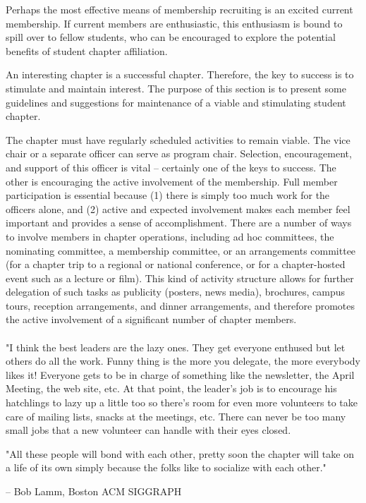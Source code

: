 Perhaps the most effective means of membership recruiting is an excited current membership. If current members are enthusiastic, this enthusiasm is bound to spill over to fellow students, who can be encouraged to explore the potential benefits of student chapter affiliation.

An interesting chapter is a successful chapter. Therefore, the key to success is to stimulate and maintain interest. The purpose of this section is to present some guidelines and suggestions for maintenance of a viable and stimulating student chapter.

The chapter must have regularly scheduled activities to remain viable. The vice chair or a separate officer can serve as program chair. Selection, encouragement, and support of this officer is vital -- certainly one of the keys to success. The other is encouraging the active involvement of the membership. Full member participation is essential because (1) there is simply too much work for the officers alone, and (2) active and expected involvement makes each member feel important and provides a sense of accomplishment. There are a number of ways to involve members in chapter operations, including ad hoc committees, the nominating committee, a membership committee, or an arrangements committee (for a chapter trip to a regional or national conference, or for a chapter-hosted event such as a lecture or film). This kind of activity structure allows for further delegation of such tasks as publicity (posters, news media), brochures, campus tours, reception arrangements, and dinner arrangements, and therefore promotes the active involvement of a significant number of chapter members.
\\
\\
"I think the best leaders are the lazy ones. They get everyone enthused but let others do all the work. Funny thing is the more you delegate, the more everybody likes it! Everyone gets to be in charge of something like the newsletter, the April Meeting, the web site, etc. At that point, the leader's job is to encourage his hatchlings to lazy up a little too so there's room for even more volunteers to take care of mailing lists, snacks at the meetings, etc. There can never be too many small jobs that a new volunteer can handle with their eyes closed.

"All these people will bond with each other, pretty soon the chapter will take on a life of its own simply because the folks like to socialize with each other."

-- Bob Lamm, Boston ACM SIGGRAPH

